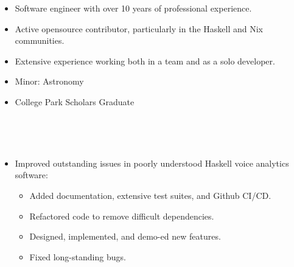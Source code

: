 \documentclass[10pt,a4paper,ragged2e,withhyper]{custom}
\begin{document}
\begin{paracol}{2}


  \begin{itemize}
    \item Software engineer with over 10 years of professional experience.
    \item Active opensource contributor, particularly in the Haskell and Nix communities.
    \item Extensive experience working both in a team and as a solo developer.
  \end{itemize}


  \begin{itemize}
  \item Minor: Astronomy
  \item College Park Scholars Graduate
  \end{itemize}

   \\






   \\

\switchcolumn



\begin{itemize}
  \item Improved outstanding issues in poorly understood Haskell voice analytics software:
    \begin{itemize}
      \item Added documentation, extensive test suites, and Github CI/CD.
      \item Refactored code to remove difficult dependencies.
      \item Designed, implemented, and demo-ed new features.
      \item Fixed long-standing bugs.
    \end{itemize}
\end{itemize}


\end{paracol}
\end{document}
